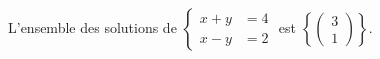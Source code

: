 L'ensemble des solutions de $\begin{cases} x+y &= 4 \\ x-y &= 2 \end{cases}$ est $\left\{\begin{pmatrix}3\\1\end{pmatrix}\right\}$.

\begin{reponses}
\end{reponses}

